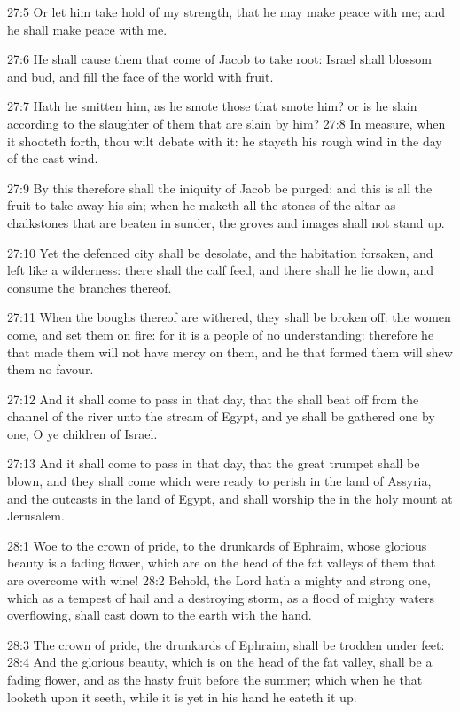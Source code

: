 27:5 Or let him take hold of my strength, that he may make peace with me; and he shall make peace with me.

27:6 He shall cause them that come of Jacob to take root: Israel shall blossom and bud, and fill the face of the world with fruit.

27:7 Hath he smitten him, as he smote those that smote him? or is he slain according to the slaughter of them that are slain by him?  27:8 In measure, when it shooteth forth, thou wilt debate with it: he stayeth his rough wind in the day of the east wind.

27:9 By this therefore shall the iniquity of Jacob be purged; and this is all the fruit to take away his sin; when he maketh all the stones of the altar as chalkstones that are beaten in sunder, the groves and images shall not stand up.

27:10 Yet the defenced city shall be desolate, and the habitation forsaken, and left like a wilderness: there shall the calf feed, and there shall he lie down, and consume the branches thereof.

27:11 When the boughs thereof are withered, they shall be broken off: the women come, and set them on fire: for it is a people of no understanding: therefore he that made them will not have mercy on them, and he that formed them will shew them no favour.

27:12 And it shall come to pass in that day, that the \LORD shall beat off from the channel of the river unto the stream of Egypt, and ye shall be gathered one by one, O ye children of Israel.

27:13 And it shall come to pass in that day, that the great trumpet shall be blown, and they shall come which were ready to perish in the land of Assyria, and the outcasts in the land of Egypt, and shall worship the \LORD in the holy mount at Jerusalem.

28:1 Woe to the crown of pride, to the drunkards of Ephraim, whose glorious beauty is a fading flower, which are on the head of the fat valleys of them that are overcome with wine!  28:2 Behold, the Lord hath a mighty and strong one, which as a tempest of hail and a destroying storm, as a flood of mighty waters overflowing, shall cast down to the earth with the hand.

28:3 The crown of pride, the drunkards of Ephraim, shall be trodden under feet: 28:4 And the glorious beauty, which is on the head of the fat valley, shall be a fading flower, and as the hasty fruit before the summer; which when he that looketh upon it seeth, while it is yet in his hand he eateth it up.

